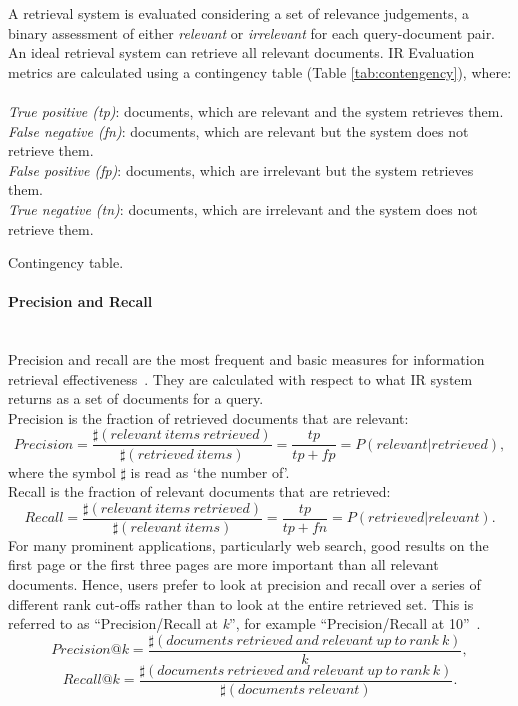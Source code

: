 A retrieval system is evaluated considering a set of relevance judgements, a binary assessment of either \textit{relevant} or \textit{irrelevant} for each query-document pair. An ideal retrieval system can retrieve all relevant documents. IR Evaluation metrics are calculated using a contingency table (Table \ref{tab:contengency}), where:\\\\
\textit{True positive (tp)}: documents, which are relevant and the system retrieves them.\\
\textit{False negative (fn)}: documents, which are relevant but the system does not retrieve them. \\
\textit{False positive (fp)}: documents, which are irrelevant but the system retrieves them.\\
\textit{True negative (tn)}: documents, which are irrelevant and the system does not retrieve them. 
\begin{table*}[t!]
  \centering
  
  \caption{Contingency table.}
  \label{tab:contengency}
\end{table*}
\FloatBarrier 
\paragraph{Precision and Recall}
\ \\
Precision and recall are the most frequent and basic measures for information retrieval effectiveness~\citep{manning2008introduction}. They are calculated with respect to what IR system returns as a set of documents for a query.\\
Precision is the fraction of retrieved documents that are relevant:
\[
Precision=\frac{\sharp(relevant \: items \: retrieved)}{\sharp(retrieved \: items)}=\frac{tp}{tp+fp}=P(relevant|retrieved),
\]
where the symbol $\sharp$ is read as `the number of'.\\
Recall is the fraction of relevant documents that are retrieved:
\[
Recall=\frac{\sharp(relevant \: items \: retrieved)}{\sharp(relevant \: items)}=\frac{tp}{tp+fn}=P(retrieved|relevant).
\]
For many prominent applications, particularly web search, good results on the first page or the first three pages are more important than all relevant documents. Hence, users prefer to look at precision and recall over a series of different rank cut-offs rather than to look at the entire retrieved set. This is referred to as ``Precision/Recall at \textit{k}'', for example ``Precision/Recall at 10''~\citep{manning2008introduction}. 
\begin{equation}
Precision@k=\frac{\sharp(documents \: retrieved \: and \: relevant \: up \: to \: rank \: k)}{k},
\end{equation}
\begin{equation}
Recall@k=\frac{\sharp(documents \: retrieved \: and \: relevant \: up \: to \: rank \: k)}{\sharp(documents \: relevant)}.
\end{equation}
